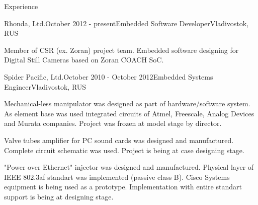 \documentclass{resume}
\begin{document}
\begin{rSection}{Experience}

\begin{rSubsection}{Rhonda, Ltd.}{October 2012 - present}{Embedded Software Developer}{Vladivostok, RUS}
\item Member of CSR (ex. Zoran) project team. Embedded software designing for Digital Still Cameras based on Zoran
COACH SoC.
\end{rSubsection}

\begin{rSubsection}{Spider Pacific, Ltd.}{October 2010 - October 2012}{Embedded Systems Engineer}{Vladivostok, RUS}
\item Mechanical-less manipulator was designed as part of hardware/software system. As element base was used 
integrated circuits of Atmel, Freescale, Analog Devices and Murata companies. Project was frozen at model stage by director.
\item Valve tubes amplifier for PC sound cards was designed and manufactured. Complete circuit schematic was 
used. Project is being at case designing stage.
\item "Power over Ethernet" injector was designed and manufactured. Physical layer of IEEE 802.3af standart was 
implemented (passive class B). Cisco Systems equipment is being used as a prototype. Implementation with entire 
standart support is being at designing stage.
\end{rSubsection}

\end{rSection}

\end{document}
